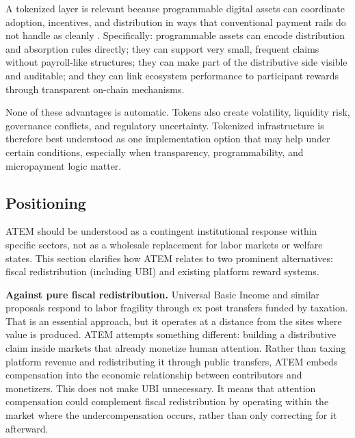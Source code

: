 \documentclass[12pt, a4paper]{article}
\begin{document}
A tokenized layer is relevant because programmable digital assets can coordinate adoption, incentives, and distribution in ways that conventional payment rails do not handle as cleanly \citep{catalini2018, cong2021}. Specifically: programmable assets can encode distribution and absorption rules directly; they can support very small, frequent claims without payroll-like structures; they can make part of the distributive side visible and auditable; and they can link ecosystem performance to participant rewards through transparent on-chain mechanisms.

None of these advantages is automatic. Tokens also create volatility, liquidity risk, governance conflicts, and regulatory uncertainty. Tokenized infrastructure is therefore best understood as one implementation option that may help under certain conditions, especially when transparency, programmability, and micropayment logic matter.

\subsection{Positioning}
\label{sec:atem-position}

ATEM should be understood as a contingent institutional response within specific sectors, not as a wholesale replacement for labor markets or welfare states. This section clarifies how ATEM relates to two prominent alternatives: fiscal redistribution (including UBI) and existing platform reward systems.

\textbf{Against pure fiscal redistribution.} Universal Basic Income and similar proposals respond to labor fragility through ex post transfers funded by taxation. That is an essential approach, but it operates at a distance from the sites where value is produced. ATEM attempts something different: building a distributive claim inside markets that already monetize human attention. Rather than taxing platform revenue and redistributing it through public transfers, ATEM embeds compensation into the economic relationship between contributors and monetizers. This does not make UBI unnecessary. It means that attention compensation could complement fiscal redistribution by operating within the market where the undercompensation occurs, rather than only correcting for it afterward.
\end{document}
